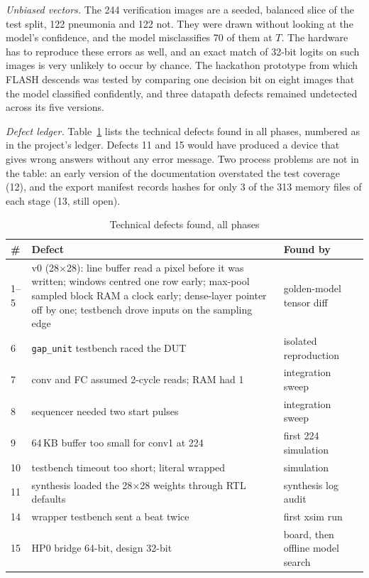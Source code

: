 \documentclass[conference]{IEEEtran}
\newcommand{\code}[1]{\texttt{#1}}
\begin{document}
\textit{Unbiased vectors.} The 244 verification images are a seeded, balanced slice of the test
split, 122 pneumonia and 122 not. They were drawn without looking at the model's confidence, and
the model misclassifies 70 of them at $T$. The hardware has to reproduce these errors as well,
and an exact match of 32-bit logits on such images is very unlikely to occur by chance. The
hackathon prototype from which FLASH descends was tested by comparing one decision bit on eight
images that the model classified confidently, and three datapath defects remained undetected
across its five versions.

\textit{Defect ledger.} Table~\ref{tab:bugs} lists the technical defects found in all phases,
numbered as in the project's ledger. Defects 11 and 15 would have produced a device that gives
wrong answers without any error message. Two process problems are not in the table: an early
version of the documentation overstated the test coverage (12), and the export manifest records
hashes for only 3 of the 313 memory files of each stage (13, still open).

\begin{table}[t]
\caption{Technical defects found, all phases}
\label{tab:bugs}
\centering\footnotesize
\begin{tabular}{@{}p{0.55cm}p{4.6cm}p{2.5cm}@{}}
\toprule
\# & Defect & Found by \\
\midrule
1--5 & v0 (28$\times$28): line buffer read a pixel before it was written; windows centred one row
early; max-pool sampled block RAM a clock early; dense-layer pointer off by one; testbench
drove inputs on the sampling edge & golden-model tensor diff \\
6 & \code{gap\_unit} testbench raced the DUT & isolated reproduction \\
7 & conv and FC assumed 2-cycle reads; RAM had 1 & integration sweep \\
8 & sequencer needed two start pulses & integration sweep \\
9 & 64\,KB buffer too small for conv1 at 224 & first 224 simulation \\
10 & testbench timeout too short; literal wrapped & simulation \\
11 & synthesis loaded the 28$\times$28 weights through RTL defaults & synthesis log audit \\
14 & wrapper testbench sent a beat twice & first xsim run \\
15 & HP0 bridge 64-bit, design 32-bit & board, then offline model search \\
\bottomrule
\end{tabular}
\end{table}
\end{document}

